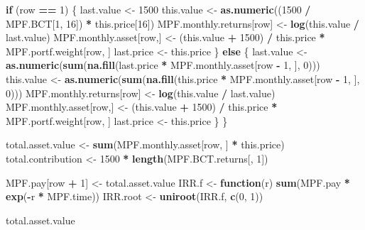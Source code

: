 \documentclass[
]{article}
\newenvironment{Shaded}{\begin{snugshade}}{\end{snugshade}}
\newcommand{\ControlFlowTok}[1]{\textcolor[rgb]{0.13,0.29,0.53}{\textbf{#1}}}
\newcommand{\DecValTok}[1]{\textcolor[rgb]{0.00,0.00,0.81}{#1}}
\newcommand{\KeywordTok}[1]{\textcolor[rgb]{0.13,0.29,0.53}{\textbf{#1}}}
\newcommand{\NormalTok}[1]{#1}
\newcommand{\OperatorTok}[1]{\textcolor[rgb]{0.81,0.36,0.00}{\textbf{#1}}}
\newcommand{\StringTok}[1]{\textcolor[rgb]{0.31,0.60,0.02}{#1}}
\begin{document}
\begin{Shaded}
\begin{Highlighting}[]
  \ControlFlowTok{if}\NormalTok{ (row }\OperatorTok{==}\StringTok{ }\DecValTok{1}\NormalTok{) \{}
\NormalTok{    last.value <-}\StringTok{ }\DecValTok{1500}
\NormalTok{    this.value <-}\StringTok{ }\KeywordTok{as.numeric}\NormalTok{((}\DecValTok{1500} \OperatorTok{/}\StringTok{ }\NormalTok{MPF.BCT[}\DecValTok{1}\NormalTok{, }\DecValTok{16}\NormalTok{]) }\OperatorTok{*}\StringTok{ }\NormalTok{this.price[}\DecValTok{16}\NormalTok{])}
\NormalTok{    MPF.monthly.returns[row] <-}\StringTok{ }\KeywordTok{log}\NormalTok{(this.value }\OperatorTok{/}\StringTok{ }\NormalTok{last.value)}
\NormalTok{    MPF.monthly.asset[row,] <-}
\StringTok{      }\NormalTok{(this.value }\OperatorTok{+}\StringTok{ }\DecValTok{1500}\NormalTok{) }\OperatorTok{/}\StringTok{ }\NormalTok{this.price }\OperatorTok{*}\StringTok{ }\NormalTok{MPF.portf.weight[row, ]}
\NormalTok{    last.price <-}\StringTok{ }\NormalTok{this.price}
\NormalTok{  \} }\ControlFlowTok{else}\NormalTok{ \{}
\NormalTok{    last.value <-}
\StringTok{      }\KeywordTok{as.numeric}\NormalTok{(}\KeywordTok{sum}\NormalTok{(}\KeywordTok{na.fill}\NormalTok{(last.price }\OperatorTok{*}\StringTok{ }\NormalTok{MPF.monthly.asset[row }\OperatorTok{-}\StringTok{ }\DecValTok{1}\NormalTok{, ], }\DecValTok{0}\NormalTok{)))}
\NormalTok{    this.value <-}
\StringTok{      }\KeywordTok{as.numeric}\NormalTok{(}\KeywordTok{sum}\NormalTok{(}\KeywordTok{na.fill}\NormalTok{(this.price }\OperatorTok{*}\StringTok{ }\NormalTok{MPF.monthly.asset[row }\OperatorTok{-}\StringTok{ }\DecValTok{1}\NormalTok{, ], }\DecValTok{0}\NormalTok{)))}
\NormalTok{    MPF.monthly.returns[row] <-}\StringTok{ }\KeywordTok{log}\NormalTok{(this.value }\OperatorTok{/}\StringTok{ }\NormalTok{last.value)}
\NormalTok{    MPF.monthly.asset[row,] <-}
\StringTok{      }\NormalTok{(this.value }\OperatorTok{+}\StringTok{ }\DecValTok{1500}\NormalTok{) }\OperatorTok{/}\StringTok{ }\NormalTok{this.price }\OperatorTok{*}\StringTok{ }\NormalTok{MPF.portf.weight[row, ]}
\NormalTok{    last.price <-}\StringTok{ }\NormalTok{this.price}
\NormalTok{  \}}
\NormalTok{\}}


\NormalTok{total.asset.value <-}\StringTok{ }\KeywordTok{sum}\NormalTok{(MPF.monthly.asset[row, ] }\OperatorTok{*}\StringTok{ }\NormalTok{this.price)}
\NormalTok{total.contribution <-}\StringTok{ }\DecValTok{1500} \OperatorTok{*}\StringTok{ }\KeywordTok{length}\NormalTok{(MPF.BCT.returns[, }\DecValTok{1}\NormalTok{])}

\NormalTok{MPF.pay[row }\OperatorTok{+}\StringTok{ }\DecValTok{1}\NormalTok{] <-}\StringTok{ }\NormalTok{total.asset.value}
\NormalTok{IRR.f <-}\StringTok{ }\ControlFlowTok{function}\NormalTok{(r)}
  \KeywordTok{sum}\NormalTok{(MPF.pay }\OperatorTok{*}\StringTok{ }\KeywordTok{exp}\NormalTok{(}\OperatorTok{-}\NormalTok{r }\OperatorTok{*}\StringTok{ }\NormalTok{MPF.time))}
\NormalTok{IRR.root <-}\StringTok{ }\KeywordTok{uniroot}\NormalTok{(IRR.f, }\KeywordTok{c}\NormalTok{(}\DecValTok{0}\NormalTok{, }\DecValTok{1}\NormalTok{))}


\NormalTok{total.asset.value}
\end{Highlighting}
\end{Shaded}
\end{document}
